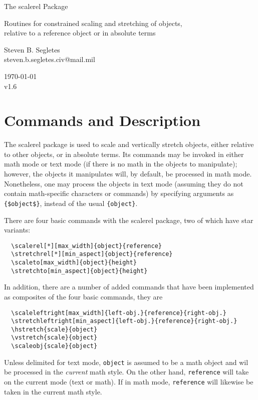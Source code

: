 \documentclass{article}
\def\version{1.6}
\let\vb\verb
\begin{document}
\begin{center}
\LARGE The \textsf{scalerel} Package\\
\rule{0em}{.7em}\small Routines for constrained scaling and stretching
of objects,\\relative to a reference object or in absolute terms\\
\rule{0em}{2.7em}\large Steven B. Segletes\\
steven.b.segletes.civ@mail.mil\\
\rule{0em}{1.7em}\today\\
v\version
\end{center}

\section{Commands and Description}
The \textsf{scalerel} package is used to scale and vertically stretch
objects, either relative to other objects, or in absolute terms.  Its
commands may be invoked in either math mode or text mode (if there is no
math in the objects to manipulate); however, the objects it manipulates
will, by default, be processed in math mode.  Nonetheless, one may
process the objects in text mode (assuming they do not contain
math-specific characters or commands) by specifying arguments as
\vb|{$object$}|, instead of the usual \vb|{object}|.

There are four basic commands with the \textsf{scalerel} package, two
of which have star variants:
\begin{verbatim}
  \scalerel[*][max_width]{object}{reference}
  \stretchrel[*][min_aspect]{object}{reference}
  \scaleto[max_width]{object}{height}
  \stretchto[min_aspect]{object}{height}
\end{verbatim} 
In addition, there are a number of added commands that have been
implemented as composites of the four basic commands, they are
\begin{verbatim}
  \scaleleftright[max_width]{left-obj.}{reference}{right-obj.}
  \stretchleftright[min_aspect]{left-obj.}{reference}{right-obj.}
  \hstretch{scale}{object}
  \vstretch{scale}{object}
  \scaleobj{scale}{object}
\end{verbatim}
Unless delimited for text mode, \texttt{object} is assumed to be a math
object and wil be processed in the \textit{current} math style.  On the
other hand, \texttt{reference} will take on the current mode (text
or math).  If in math mode, \texttt{reference} will likewise be taken in the 
current math style.
\end{document}
